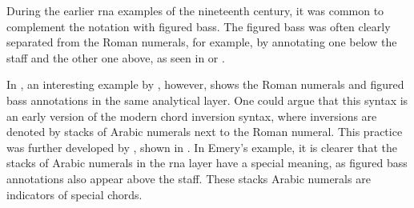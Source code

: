 
During the earlier \gls{rna} examples of the nineteenth
century, it was common to complement the notation with
figured bass. The figured bass was often clearly separated
from the Roman numerals, for example, by annotating one
below the staff and the other one above, as seen in
 or
.

In , an
interesting example by \textcite{bussler1878praktische},
however, shows the Roman numerals and figured bass
annotations in the same analytical layer. One could argue
that this syntax is an early version of the modern chord
inversion syntax, where inversions are denoted by stacks of
Arabic numerals next to the Roman numeral. This practice was
further developed by \textcite{emery1879elements}, shown in
. In Emery's
example, it is clearer that the stacks of Arabic numerals in
the \gls{rna} layer have a special meaning, as figured bass
annotations also appear above the staff. These stacks Arabic
numerals are indicators of special chords.

